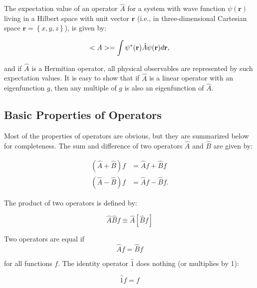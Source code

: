 \documentclass[
  9pt,
]{extbook}
\theoremstyle{definition}
\theoremstyle{definition}
\theoremstyle{definition}
\theoremstyle{remark}
\begin{document}
The expectation value of an operator \(\hat{A}\) for a system with wave function \(\psi(\mathbf{r})\) living in a Hilbert space with unit vector \(\mathbf{r}\) (i.e., in three-dimensional Cartesian space \(\mathbf{r} = \left\{ x,y,z \right\}\)), is given by:

\begin{equation}
<A> = \int \psi^{*}({\bf r}) \hat{A} \psi({\bf r}) d{\bf r},
\label{eq:ee1b}
\end{equation}

and if \(\hat{A}\) is a Hermitian operator, all physical observables are represented by such expectation values. It is easy to show that if \(\hat{A}\) is a linear operator with an eigenfunction \(g\), then any multiple of \(g\) is also an eigenfunction of \(\hat{A}\).

\hypertarget{basic-properties-of-operators}{%
\subsection{Basic Properties of Operators}\label{basic-properties-of-operators}}

Most of the properties of operators are obvious, but they are summarized below for completeness.
The sum and difference of two operators \(\hat{A}\) and \(\hat{B}\) are given by:

\begin{equation}
\begin{aligned}
 (\hat{A} + \hat{B}) f &= \hat{A} f + \hat{B} f \\
(\hat{A} - \hat{B}) f &= \hat{A} f - \hat{B} f.
\end{aligned}
\label{eq:bp0}
\end{equation}

The product of two operators is defined by:

\begin{equation}
\hat{A} \hat{B} f \equiv \hat{A} [ \hat{B} f ]
\label{eq:bp1}
\end{equation}

Two operators are equal if
\begin{equation}
\hat{A} f = \hat{B} f
\label{eq:bp2}
\end{equation}

for all functions \(f\). The identity operator \(\hat{1}\) does nothing (or multiplies by 1):

\begin{equation}
{\hat 1} f = f
\label{eq:bp3}
\end{equation}
\end{document}
